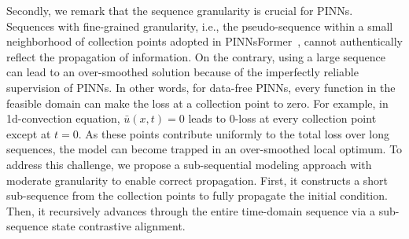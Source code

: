 


Secondly, we remark that the sequence granularity is crucial for PINNs. Sequences with fine-grained granularity, i.e., the pseudo-sequence within a small neighborhood of collection points adopted in PINNsFormer~\cite{zhao2024pinnsformer}, cannot authentically reflect the propagation of information. On the contrary, using a large sequence can lead to an over-smoothed solution because of the imperfectly reliable supervision of PINNs. In other words, for data-free PINNs, every function in the feasible domain can make the loss at a collection point to zero. For example, in 1d-convection equation, $\bar u(x,t)=0$ leads to 0-loss at every collection point except at $t=0$. As these points contribute uniformly to the total loss over long sequences, the model can become trapped in an over-smoothed local optimum.
To address this challenge, we propose a sub-sequential modeling approach with moderate granularity to enable correct propagation. First, it constructs a short sub-sequence from the collection points to fully propagate the initial condition. Then, it recursively advances through the entire time-domain sequence via a sub-sequence state contrastive alignment.

